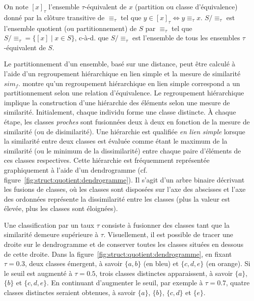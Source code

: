 \begin{definition}
    On note $[x]_\tau$ l'ensemble $\tau$-équivalent de $x$ (partition ou classe d'équivalence) donné par la clôture transitive de $\equiv_\tau$ tel que $y \in [x]_\tau \iff y \equiv_\tau x$.
    $S/\equiv_\tau$ est l'ensemble quotient (ou partitionnement) de $S$ par $\equiv_\tau$ tel que $S/\equiv_\tau = \{[x] \mid x \in S\}$, c-à-d. que $S/\equiv_\tau$ est l'ensemble de tous les ensembles $\tau$-équivalent de $S$.
\end{definition}

Le partitionnement d'un ensemble, basé sur une distance, peut être calculé à l'aide d'un regroupement hiérarchique en lien simple et la mesure de similarité $sim_f$.
\cite{carlssonCharacterizationStabilityConvergence2010} montre qu'un regroupement hiérarchique en lien simple correspond a un partitionnement selon une relation d'équivalence.
Le regroupement hiérarchique implique la construction d'une hiérarchie des éléments selon une mesure de similarité.
Initialement, chaque individu forme une classe distincte.
À chaque étape, les classes \emph{proches} sont fusionnées deux à deux en fonction de la mesure de similarité (ou de disimilarité).
Une hiérarchie est qualifiée \emph{en lien simple} lorsque la similarité entre deux classes est évaluée comme étant le maximum de la similarité (ou le minimum de la dissimilarité) entre chaque paire d'éléments de ces classes respectives.
Cette hiérarchie est fréquemment représentée graphiquement à l'aide d'un dendrogramme (cf. figure~\ref{fig:struct:quotient:dendrogramme}).
Il s'agit d'un arbre binaire décrivant les fusions de classes, où les classes sont disposées sur l'axe des abscisses et l'axe des ordonnées représente la dissimilarité entre les classes (plus la valeur est élevée, plus les classes sont éloignées).

Une classification par un taux $\tau$ consiste à fusionner des classes tant que la similarité demeure supérieure à $\tau$.
Visuellement, il est possible de tracer une droite sur le dendrogramme et de conserver toutes les classes situées en dessous de cette droite.
Dans la figure~\ref{fig:struct:quotient:dendrogramme}, en fixant $\tau = 0.3$, deux classes émergent, à savoir $\{a, b\}$ (en bleu) et $\{c, d, e\}$ (en orange).
Si le seuil est augmenté à $\tau = 0.5$, trois classes distinctes apparaissent, à savoir $\{a\}$, $\{b\}$ et $\{c, d, e\}$.
En continuant d'augmenter le seuil, par exemple à $\tau = 0.7$, quatre classes distinctes seraient obtenues, à savoir $\{a\}$, $\{b\}$, $\{c, d\}$ et $\{e\}$.

